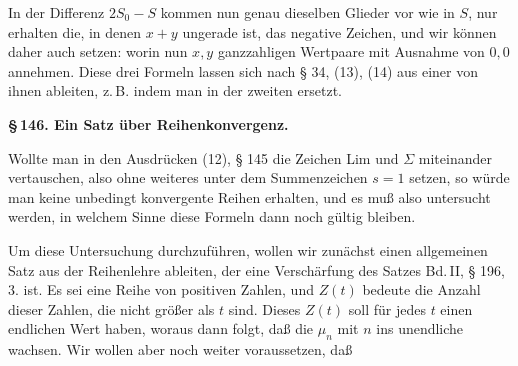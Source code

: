 In der Differenz $2S_0 - S$ kommen nun genau dieselben
Glieder vor wie in $S$, nur erhalten die, in denen $x+y$ ungerade
ist, das negative Zeichen, und wir können daher auch setzen:
worin nun $x, y$  ganzzahligen Wertpaare mit Ausnahme von
$0,0$ annehmen. Diese drei Formeln lassen sich nach § 34, (13), (14)
aus einer von ihnen ableiten, z.\,B. indem man in der zweiten
ersetzt.

\begin{center}\textbf{\S\,146. Ein Satz über Reihenkonvergenz.}\end{center}

Wollte man in den Ausdrücken (12), § 145 die Zeichen Lim
und $\Sigma$ miteinander vertauschen, also ohne weiteres unter dem
Summenzeichen $s=1$ setzen, so würde man keine unbedingt
konvergente Reihen erhalten, und es muß also untersucht werden,
in welchem Sinne diese Formeln dann noch gültig bleiben.

Um diese Untersuchung durchzuführen, wollen wir zunächst
einen allgemeinen Satz aus der Reihenlehre ableiten, der eine
Verschärfung des Satzes Bd.\,II, § 196, 3. ist. Es sei
eine Reihe von  positiven Zahlen, und $Z(t)$
bedeute die Anzahl dieser Zahlen, die nicht größer als $t$ sind.
Dieses $Z(t)$ soll für jedes $t$ einen endlichen Wert haben, woraus
dann folgt, daß die $\mu_n$ mit $n$ ins unendliche wachsen. Wir
wollen aber noch weiter voraussetzen, daß
